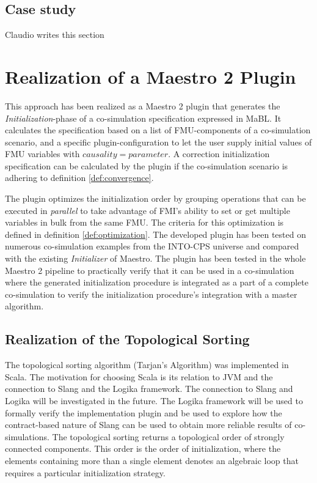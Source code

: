 \documentclass[runningheads]{llncs}
\begin{document}
\subsection{Case study}
Claudio writes this section 



\section{Realization of a Maestro 2 Plugin}\label{sc:implementation}
This approach has been realized as a Maestro 2 plugin that generates the \textit{Initialization}-phase of a co-simulation specification expressed in MaBL. It calculates the specification based on a list of FMU-components of a co-simulation scenario, and a specific plugin-configuration to let the user supply initial values of FMU variables with $causality=parameter$. A correction initialization specification can be calculated by the plugin if the co-simulation scenario is adhering to definition \ref{def:convergence}.

The plugin optimizes the initialization order by grouping operations that can be executed in \textit{parallel} to take advantage of FMI's ability to set or get multiple variables in bulk from the same FMU. The criteria for this optimization is defined in definition \ref{def:optimization}. 
The developed plugin has been tested on numerous co-simulation examples from the INTO-CPS universe\cite{Maestro} and compared with the existing \textit{Initializer} of Maestro. The plugin has been tested in the whole Maestro 2 pipeline to practically verify that it can be used in a co-simulation where the generated initialization procedure is integrated as a part of a complete co-simulation to verify the initialization procedure's integration with a master algorithm.

\subsection{Realization of the Topological Sorting}
The topological sorting algorithm (Tarjan's Algorithm) was implemented in Scala. The motivation for choosing Scala is its relation to JVM and the connection to Slang and the Logika framework\cite{inbook}. The connection to Slang and Logika will be investigated in the future. The Logika framework will be used to formally verify the implementation plugin and be used to explore how the contract-based nature of Slang can be used to obtain more reliable results of co-simulations. The topological sorting returns a topological order of strongly connected components. This order is the order of initialization, where the elements containing more than a single element denotes an algebraic loop that requires a particular initialization strategy. 
\end{document}
